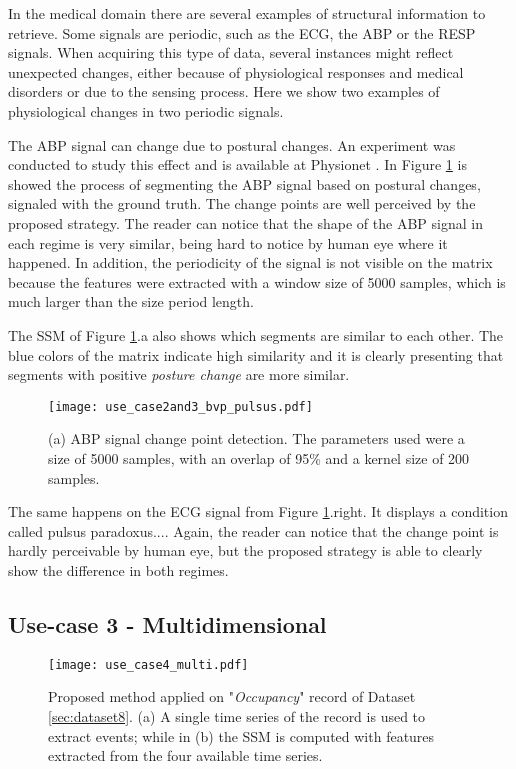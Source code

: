 In the medical domain there are several examples of structural information to retrieve. Some signals are periodic, such as the \gls{ECG}, the \gls{ABP} or the \gls{RESP} signals. When acquiring this type of data, several instances might reflect unexpected changes, either because of physiological responses and medical disorders or due to the sensing process. Here we show two examples of physiological changes in two periodic signals.
\par
The \gls{ABP} signal can change due to postural changes. An experiment was conducted to study this effect and is available at Physionet \cite{tilt, PhysioNet}. In Figure \ref{fig:example2_3} is showed the process of segmenting the \gls{ABP} signal based on postural changes, signaled with the ground truth. The change points are well perceived by the proposed strategy. The reader can notice that the shape of the \gls{ABP} signal in each regime is very similar, being  hard to notice by human eye where it happened. In addition, the periodicity of the signal is not visible on the matrix because the features were extracted with a window size of 5000 samples, which is much larger than the size period length.
\par
The \gls{SSM} of Figure \ref{fig:example2_3}.a also shows which segments are similar to each other. The blue colors of the matrix indicate high similarity and it is clearly presenting that segments with positive \textit{posture change} are more similar.

\begin{figure}
    \centering
    \texttt{[image: use\_case2and3\_bvp\_pulsus.pdf]}
    \caption{(a) ABP signal change point detection. The parameters used were a size of 5000 samples, with an overlap of 95\% and a kernel size of 200 samples.}
    \label{fig:example2_3}
\end{figure}


The same happens on the \gls{ECG} signal from Figure \ref{fig:example2_3}.right. It displays a condition called pulsus paradoxus.... Again, the reader can notice that the change point is hardly perceivable by human eye, but the proposed strategy is able to clearly show the difference in both regimes.


\subsection{Use-case 3 - Multidimensional}

\begin{figure}
    \centering
    \texttt{[image: use\_case4\_multi.pdf]}
    \caption{Proposed method applied on "\textit{Occupancy}" record of Dataset \ref{sec:dataset8}. (a) A single time series of the record is used to extract events; while in (b) the \gls{SSM} is computed with features extracted from the four available time series.}
    \label{fig:example4}
\end{figure}

